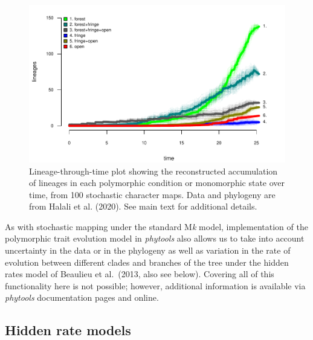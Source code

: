 \documentclass[fleqn,10pt,lineno]{wlpeerj} %
\begin{document}
\begin{figure}
\includegraphics[width=1\linewidth]{Revell.phytools-v2_peerj_files/figure-latex/fig08-ltt-fitpolyMk-1} \caption{Lineage-through-time plot showing the reconstructed accumulation of lineages in each polymorphic condition or monomorphic state over time, from 100 stochastic character maps. Data and phylogeny are from Halali et al. (2020). See main text for additional details.}\label{fig:fig08-ltt-fitpolyMk}
\end{figure}

As with stochastic mapping under the standard M\emph{k} model, implementation of the polymorphic trait evolution model in \emph{phytools} also allows us to take into account uncertainty in the data or in the phylogeny as well as variation in the rate of evolution between different clades and branches of the tree under the hidden rates model of Beaulieu et al.~(2013, also see below). Covering all of this functionality here is not possible; however, additional information is available via \emph{phytools} documentation pages and online.

\hypertarget{hidden-rate-models}{%
\subsection{Hidden rate models}\label{hidden-rate-models}}
\end{document}
